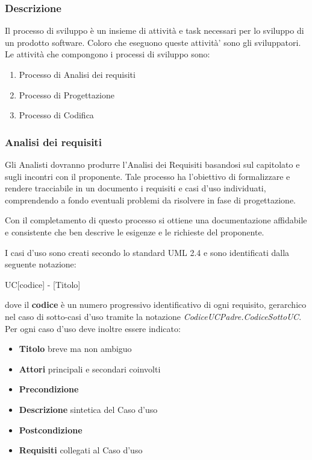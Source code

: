 \documentclass[12pt,a4paper]{article}
\begin{document}
\subsubsection{Descrizione}
Il processo di sviluppo è un insieme di attività e task necessari per lo sviluppo di un prodotto software. Coloro che eseguono queste attività' sono gli sviluppatori. Le attività che compongono i processi di sviluppo sono:
\begin{enumerate}
\item Processo di Analisi dei requisiti
\item Processo di Progettazione
\item Processo di Codifica
\end{enumerate}

\subsubsection{Analisi dei requisiti} %

Gli Analisti dovranno produrre l'Analisi dei Requisiti basandosi sul capitolato e sugli incontri con il proponente. Tale processo ha l'obiettivo di formalizzare e rendere tracciabile in un documento i requisiti e casi d'uso individuati, comprendendo a fondo eventuali problemi da risolvere in fase di progettazione.

Con il completamento di questo processo si ottiene una documentazione affidabile e consistente che ben descrive le esigenze e le richieste del proponente.

I casi d'uso sono creati secondo lo standard UML 2.4 e sono identificati dalla seguente notazione:
\begin{center}
UC[codice] - [Titolo]
\end{center}
dove il \textbf{codice} è un numero progressivo identificativo di ogni requisito, gerarchico nel  caso di sotto-casi d'uso tramite la notazione \textit{CodiceUCPadre.CodiceSottoUC}. Per ogni caso d'uso deve inoltre essere indicato:
\begin{itemize}
\item \textbf{Titolo} breve ma non ambiguo
\item \textbf{Attori} principali e secondari coinvolti
\item \textbf{Precondizione}
\item \textbf{Descrizione} sintetica del Caso d'uso
\item \textbf{Postcondizione}
\item \textbf{Requisiti} collegati al Caso d'uso
\end{itemize}
\end{document}
